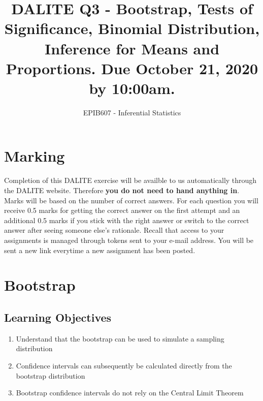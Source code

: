 \documentclass[letterpaper,10pt,twocolumn,twoside,]{pinp}
\title{DALITE Q3 - Bootstrap, Tests of Significance, Binomial Distribution,
Inference for Means and Proportions. Due October 21, 2020 by 10:00am.}
\author[a]{EPIB607 - Inferential Statistics}
\affil[a]{Fall 2020, McGill University}
\providecommand{\tightlist}{%
  \setlength{\itemsep}{0pt}\setlength{\parskip}{0pt}}
\begin{document}
\verticaladjustment{-2pt}

\maketitle
\thispagestyle{firststyle}



\hypertarget{marking}{%
\section*{Marking}\label{marking}}

Completion of this DALITE exercise will be availble to us automatically
through the DALITE website. Therefore \textbf{you do not need to hand
anything in}. Marks will be based on the number of correct answers. For
each question you will receive 0.5 marks for getting the correct answer
on the first attempt and an additional 0.5 marks if you stick with the
right answer or switch to the correct answer after seeing someone else's
rationale. Recall that access to your assignments is managed through
tokens sent to your e-mail address. You will be sent a new link
everytime a new assignment has been posted.

\hypertarget{bootstrap}{%
\section{Bootstrap}\label{bootstrap}}

\hypertarget{learning-objectives}{%
\subsection{Learning Objectives}\label{learning-objectives}}

\begin{enumerate}
\def\labelenumi{\arabic{enumi}.}
\tightlist
\item
  Understand that the bootstrap can be used to simulate a sampling
  distribution
\item
  Confidence intervals can subsequently be calculated directly from the
  bootstrap distribution
\item
  Bootstrap confidence intervals do not rely on the Central Limit
  Theorem
\end{enumerate}
\end{document}
